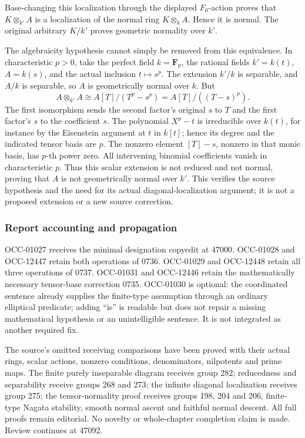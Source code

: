 Base-changing this localization through the displayed \(F_0\)-action proves that \(K\otimes_{k'}A\) is a localization of the normal ring \(K\otimes_kA\). Hence it is normal. The original arbitrary \(K/k'\) proves geometric normality over \(k'\).

The algebraicity hypothesis cannot simply be removed from this equivalence. In characteristic \(p>0\), take the perfect field \(k=\mathbf F_p\), the rational fields \(k'=k(t)\), \(A=k(s)\), and the actual inclusion \(t\mapsto s^p\). The extension \(k'/k\) is separable, and \(A/k\) is separable, so \(A\) is geometrically normal over \(k\). But \[
 A\otimes_{k'}A\cong A[T]/(T^p-s^p)
                    =A[T]/((T-s)^p).
\] The first isomorphism sends the second factor's original \(s\) to \(T\) and the first factor's \(s\) to the coefficient \(s\). The polynomial \(X^p-t\) is irreducible over \(k(t)\), for instance by the Eisenstein argument at \(t\) in \(k[t]\); hence its degree and the indicated tensor basis are \(p\). The nonzero element \([T]-s\), nonzero in that monic basis, has \(p\)-th power zero. All intervening binomial coefficients vanish in characteristic \(p\). Thus this scalar extension is not reduced and not normal, proving that \(A\) is not geometrically normal over \(k'\). This verifies the source hypothesis and the need for its actual diagonal-localization argument; it is not a proposed extension or a new source correction.

\subsubsection{Report accounting and propagation}\label{report-accounting-and-propagation}

OCC-01027 receives the minimal designation copyedit at 47000. OCC-01028 and OCC-12447 retain both operations of 0736. OCC-01029 and OCC-12448 retain all three operations of 0737. OCC-01031 and OCC-12446 retain the mathematically necessary tensor-base correction 0735. OCC-01030 is optional: the coordinated sentence already supplies the finite-type assumption through an ordinary elliptical predicate; adding ``is'' is readable but does not repair a missing mathematical hypothesis or an unintelligible sentence. It is not integrated as another required fix.

The source's omitted receiving comparisons have been proved with their actual rings, scalar actions, nonzero conditions, denominators, nilpotents and prime maps. The finite purely inseparable diagram receives group 282; reducedness and separability receive groups 268 and 273; the infinite diagonal localization receives group 275; the tensor-normality proof receives groups 198, 204 and 206, finite-type Nagata stability, smooth normal ascent and faithful normal descent. All full proofs remain editorial. No novelty or whole-chapter completion claim is made. Review continues at 47092.
